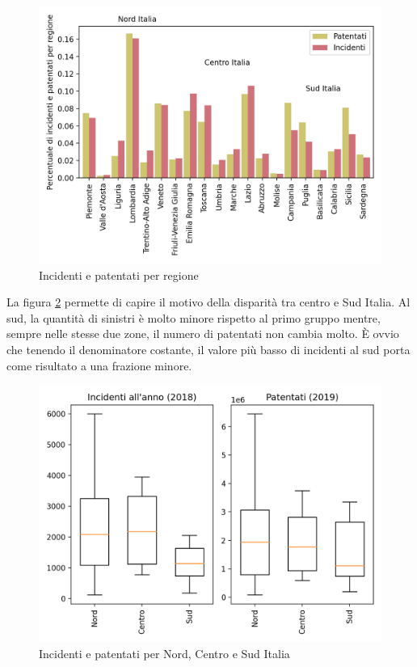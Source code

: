 \documentclass[a4paper,12pt]{report}
\begin{document}
\begin{figure}
    \hfill\includegraphics[width=0.7\linewidth]{../src/incidenti/incidenti_aci/mappe_regioni/incidenti_patenti_bar.png}\hspace*{\fill}
    \caption{Incidenti e patentati per regione}
    \label{fig:incidenti-patentati-bar}
\end{figure}

La figura \ref{fig:incidenti-patentati-box} permette di capire il motivo della disparità 
tra centro e Sud Italia. 
Al sud, la quantità di sinistri è molto minore rispetto al primo gruppo mentre, 
sempre nelle stesse due zone, il numero di patentati non cambia molto. 
\`E ovvio che tenendo il denominatore costante, il valore più basso di incidenti al 
sud porta come risultato a una frazione minore. 

\begin{figure}
    \hfill\includegraphics[width=0.7\linewidth]{../src/incidenti/incidenti_aci/mappe_regioni/incidenti_patenti_box.png}\hspace*{\fill}
    \caption{Incidenti e patentati per Nord, Centro e Sud Italia}
    \label{fig:incidenti-patentati-box}
\end{figure}
\end{document}
